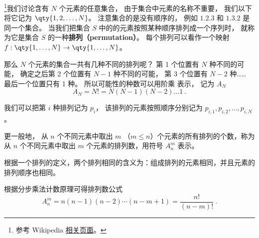 
\begin{issues}
\end{issues}




\footnote{参考 Wikipedia \href{https://en.wikipedia.org/wiki/Permutation}{相关页面}。}我们讨论含有 $N$ 个元素的任意集合， 由于集合中元素的名称不重要， 我们以下将它记为 $\qty{1,2,\dots, N}$。 注意集合的是没有顺序的， 例如 $\qty{1,2,3}$ 和 $\qty{1,3,2}$ 是同一个集合。 当我们把集合 $S$ 中的的元素按照某种顺序排列成一个序列时， 就称为它是集合 $S$ 的一种\textbf{排列（permutation）}。 每个排列可以看作一个映射 $f:\qty{1,\dots,N}\to\qty{1,\dots,N}$。

那么 $N$ 个元素的集合一共有几种不同的排列呢？ 第 1 个位置有 $N$ 种不同的可能， 确定之后第 2 个位置有 $N-1$ 种不同的可能， 第 3 个位置有 $N-2$ 种…… 最后一个位置只有 1 种。 所以可能性的种数可以用阶乘 表示， 记为 $A_N$
\begin{equation}
A_N = N! = N(N-1)(N-2)\dots 1~.
\end{equation}

我们可以把第 $i$ 种排列记为 $p_i$， 该排列的元素按照顺序分别记为 $p_{i,1}, p_{i,2}, \dots, p_{i,N}$。

更一般地， 从 $n$ 个不同元素中取出 $m$ （$m \leq n$）个元素的所有排列的个数，称为从 $n$ 个不同元素中取出 $m$ 个元素的排列数，用符号 $A_n^m$ 表示。

根据一个排列的定义，两个排列相同的含义为：组成排列的元素相同，并且元素的排列顺序也相同。

根据分步乘法计数原理可得排列数公式
\begin{equation}\label{eq_permut_1}
A_n^m = n (n - 1)(n - 2) \cdots (n - m + 1) =\frac{n!}{(n - m)!}~.
\end{equation}

